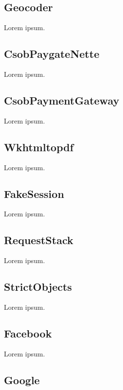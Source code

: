 \tocless\subsection{Geocoder} \label{sec:state:geocoder}

Lorem ipsum.

\tocless\subsection{CsobPaygateNette} \label{sec:state:csob-paygate-nette}

Lorem ipsum.

\tocless\subsection{CsobPaymentGateway} \label{sec:state:csob-payment-gateway}

Lorem ipsum.

\tocless\subsection{Wkhtmltopdf} \label{sec:state:wkhtmltopdf}

Lorem ipsum.

\tocless\subsection{FakeSession} \label{sec:state:fake-session}

Lorem ipsum.

\tocless\subsection{RequestStack} \label{sec:state:request-stack}

Lorem ipsum.

\tocless\subsection{StrictObjects} \label{sec:state:strict-objects}

Lorem ipsum.

\tocless\subsection{Facebook} \label{sec:state:facebook}

Lorem ipsum.

\tocless\subsection{Google} \label{sec:state:google}

